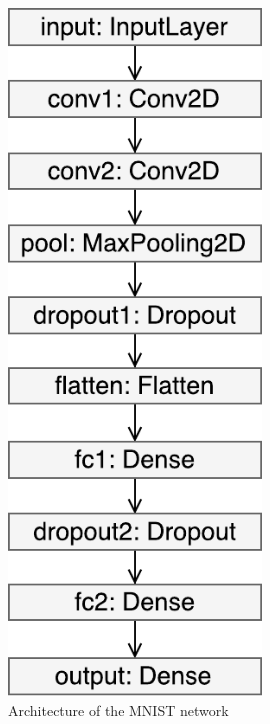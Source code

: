 \begin{figure}
    \begin{minipage}{0.5\textwidth}
        \centering
            \includegraphics[width=0.6\textwidth]{fig/mnist_keras.pdf}
            \caption{Architecture of the MNIST network}
            \label{mnist:architecture}
    \end{minipage}
    \begin{minipage}{0.4\textwidth}
        \centering

\end{minipage}
\end{figure}
